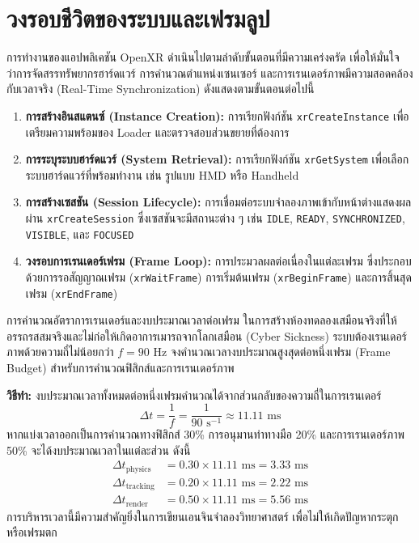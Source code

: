 \section{วงรอบชีวิตของระบบและเฟรมลูป}

การทำงานของแอปพลิเคชัน OpenXR ดำเนินไปตามลำดับขั้นตอนที่มีความเคร่งครัด เพื่อให้มั่นใจว่าการจัดสรรทรัพยากรฮาร์ดแวร์ การคำนวณตำแหน่งเซนเซอร์ และการเรนเดอร์ภาพมีความสอดคล้องกับเวลาจริง (Real-Time Synchronization) ดังแสดงตามขั้นตอนต่อไปนี้

\begin{enumerate}
    \item \textbf{การสร้างอินสแตนซ์ (Instance Creation):} การเรียกฟังก์ชัน \texttt{xrCreateInstance} เพื่อเตรียมความพร้อมของ Loader และตรวจสอบส่วนขยายที่ต้องการ
    \item \textbf{การระบุระบบฮาร์ดแวร์ (System Retrieval):} การเรียกฟังก์ชัน \texttt{xrGetSystem} เพื่อเลือกระบบฮาร์ดแวร์ที่พร้อมทำงาน เช่น รูปแบบ HMD หรือ Handheld
    \item \textbf{การสร้างเซสชัน (Session Lifecycle):} การเชื่อมต่อระบบจำลองภาพเข้ากับหน้าต่างแสดงผลผ่าน \texttt{xrCreateSession} ซึ่งเซสชันจะมีสถานะต่าง ๆ เช่น \texttt{IDLE}, \texttt{READY}, \texttt{SYNCHRONIZED}, \texttt{VISIBLE}, และ \texttt{FOCUSED}
    \item \textbf{วงรอบการเรนเดอร์เฟรม (Frame Loop):} การประมวลผลต่อเนื่องในแต่ละเฟรม ซึ่งประกอบด้วยการรอสัญญาณเฟรม (\texttt{xrWaitFrame}) การเริ่มต้นเฟรม (\texttt{xrBeginFrame}) และการสิ้นสุดเฟรม (\texttt{xrEndFrame})
\end{enumerate}

\begin{workedexamplebox}{การคำนวณอัตราการเรนเดอร์และงบประมาณเวลาต่อเฟรม}
ในการสร้างห้องทดลองเสมือนจริงที่ให้อรรถรสสมจริงและไม่ก่อให้เกิดอาการเมารถจากโลกเสมือน (Cyber Sickness) ระบบต้องเรนเดอร์ภาพด้วยความถี่ไม่น้อยกว่า $f = 90\text{ Hz}$ จงคำนวณเวลางบประมาณสูงสุดต่อหนึ่งเฟรม (Frame Budget) สำหรับการคำนวณฟิสิกส์และการเรนเดอร์ภาพ

\textbf{วิธีทำ:}
งบประมาณเวลาทั้งหมดต่อหนึ่งเฟรมคำนวณได้จากส่วนกลับของความถี่ในการเรนเดอร์
\begin{equation}
\Delta t = \frac{1}{f} = \frac{1}{90\text{ s}^{-1}} \approx 11.11\text{ ms}
\end{equation}
หากแบ่งเวลาออกเป็นการคำนวณทางฟิสิกส์ 30\% การอนุมานท่าทางมือ 20\% และการเรนเดอร์ภาพ 50\% จะได้งบประมาณเวลาในแต่ละส่วน ดังนี้
\begin{align}
\Delta t_{\text{physics}} &= 0.30 \times 11.11\text{ ms} = 3.33\text{ ms} \\
\Delta t_{\text{tracking}} &= 0.20 \times 11.11\text{ ms} = 2.22\text{ ms} \\
\Delta t_{\text{render}} &= 0.50 \times 11.11\text{ ms} = 5.56\text{ ms}
\end{align}
การบริหารเวลานี้มีความสำคัญยิ่งในการเขียนเอนจินจำลองวิทยาศาสตร์ เพื่อไม่ให้เกิดปัญหากระตุกหรือเฟรมตก
\end{workedexamplebox}

